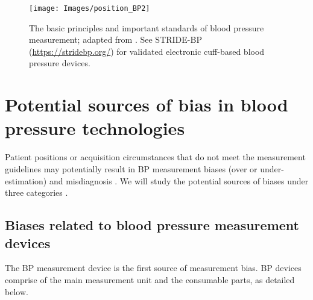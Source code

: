\documentclass[journal,article,moreauthors]{Definitions/mdpi}
\begin{document}
\begin{figure}[tb]
\centering
\texttt{[image: Images/position\_BP2]}
\caption{The basic principles and important standards of blood pressure measurement; adapted from \citep{Stergiou2021-fl}. See STRIDE-BP (\url{https://stridebp.org/}) for validated electronic cuff-based blood pressure devices.}\label{Fig: principle}
\end{figure}

\section{Potential sources of bias in blood pressure technologies} \label{sec: BP_tech_biases}
Patient positions or acquisition circumstances that do not meet the measurement guidelines may potentially result in BP measurement biases (over or under-estimation) and misdiagnosis \citep{Wagner2012-id,kallioinen2017sources, ogedegbe2010principles}. We will study the potential sources of biases under three categories \citep{mancia20132013, ogedegbe2010principles}.

\subsection{Biases related to blood pressure measurement devices}
The BP measurement device is the first source of measurement bias. BP devices comprise of the main measurement unit and the consumable parts, as detailed below.
\end{document}
